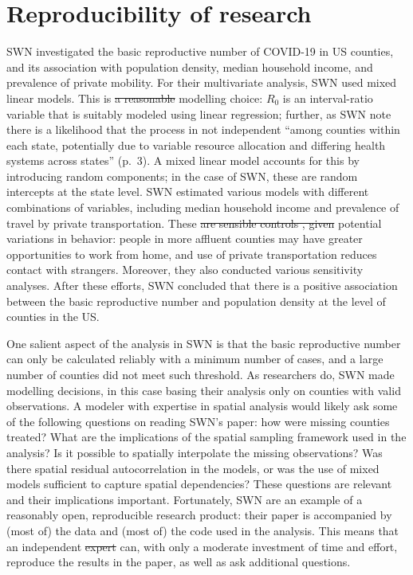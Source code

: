 \documentclass[]{elsarticle} %
\providecommand{\DIFaddtex}[1]{{\protect\color{blue}\uwave{#1}}} %
\providecommand{\DIFdeltex}[1]{{\protect\color{red}\sout{#1}}}                      %
\providecommand{\DIFaddbegin}{} %
\providecommand{\DIFaddend}{} %
\providecommand{\DIFdelbegin}{} %
\providecommand{\DIFdelend}{} %
\providecommand{\DIFadd}[1]{\texorpdfstring{\DIFaddtex{#1}}{#1}} %
\providecommand{\DIFdel}[1]{\texorpdfstring{\DIFdeltex{#1}}{}} %
\newcommand{\DIFscaledelfig}{0.5}
\newlength{\DIFdelgraphicswidth} %
\newlength{\DIFdelgraphicsheight} %
\newcommand{\DIFaddincludegraphics}[2][]{{\color{blue}\fbox{\DIFOincludegraphics[#1]{#2}}}} %
\newcommand{\DIFdelincludegraphics}[2][]{%
\sbox{\DIFdelgraphicsbox}{\DIFOincludegraphics[#1]{#2}}%
\settoboxwidth{\DIFdelgraphicswidth}{\DIFdelgraphicsbox} %
\settoboxtotalheight{\DIFdelgraphicsheight}{\DIFdelgraphicsbox} %
\scalebox{\DIFscaledelfig}{%
\parbox[b]{\DIFdelgraphicswidth}{\usebox{\DIFdelgraphicsbox}\\[-\baselineskip] \rule{\DIFdelgraphicswidth}{0em}}\llap{\resizebox{\DIFdelgraphicswidth}{\DIFdelgraphicsheight}{%
\setlength{\unitlength}{\DIFdelgraphicswidth}%
\begin{picture}(1,1)%
\thicklines\linethickness{2pt} %
{\color[rgb]{1,0,0}\put(0,0){\framebox(1,1){}}}%
{\color[rgb]{1,0,0}\put(0,0){\line( 1,1){1}}}%
{\color[rgb]{1,0,0}\put(0,1){\line(1,-1){1}}}%
\end{picture}%
}\hspace*{3pt}}} %
} %
\DeclareRobustCommand{\DIFaddbegin}{\DIFOaddbegin \let\includegraphics\DIFaddincludegraphics} %
\DeclareRobustCommand{\DIFaddend}{\DIFOaddend \let\includegraphics\DIFOincludegraphics} %
\DeclareRobustCommand{\DIFdelbegin}{\DIFOdelbegin \let\includegraphics\DIFdelincludegraphics} %
\DeclareRobustCommand{\DIFdelend}{\DIFOaddend \let\includegraphics\DIFOincludegraphics} %
\begin{document}
\hypertarget{reproducibility-of-research}{%
\section{Reproducibility of
research}\label{reproducibility-of-research}}

SWN investigated the basic reproductive number of COVID-19 in US
counties, and its association with population density, median household
income, and prevalence of private mobility. For their multivariate
analysis, SWN used mixed linear models. This is \DIFdelbegin \DIFdel{a reasonable }\DIFdelend \DIFaddbegin \DIFadd{an appropriate }\DIFaddend modelling
choice: \(R_0\) is an interval-ratio variable that is suitably modeled
using linear regression; further, as SWN note there is a likelihood that
the process in not independent ``among counties within each state,
potentially due to variable resource allocation and differing health
systems across states'' (p.~3). A mixed linear model accounts for this
by introducing random components; in the case of SWN, these are random
intercepts at the state level. SWN estimated various models with
different combinations of variables, including median household income
and prevalence of travel by private transportation. These \DIFdelbegin \DIFdel{are sensible
controls , given }\DIFdelend \DIFaddbegin \DIFadd{controls help
to account for }\DIFaddend potential variations in behavior: people in more affluent
counties may have greater opportunities to work from home, and use of
private transportation reduces contact with strangers. Moreover, they
also conducted various sensitivity analyses. After these efforts, SWN
concluded that there is a positive association between the basic
reproductive number and population density at the level of counties in
the US.

One salient aspect of the analysis in SWN is that the basic reproductive
number can only be calculated reliably with a minimum number of cases,
and a large number of counties did not meet such threshold. As
researchers do, SWN made modelling decisions, in this case basing their
analysis only on counties with valid observations. A modeler with
expertise in spatial analysis would likely ask some of the following
questions on reading SWN's paper: how were missing counties treated?
What are the implications of the spatial sampling framework used in the
analysis? Is it possible to spatially interpolate the missing
observations? Was there spatial residual autocorrelation in the models,
or was the use of mixed models sufficient to capture spatial
dependencies? These questions are relevant and their implications
important. Fortunately, SWN are an example of a reasonably open,
reproducible research product: their paper is accompanied by (most of)
the data and (most of) the code used in the analysis. This means that an
independent \DIFdelbegin \DIFdel{expert }\DIFdelend \DIFaddbegin \DIFadd{researcher }\DIFaddend can, with only a moderate investment of time and
effort, reproduce the results in the paper, as well as ask additional
questions.
\end{document}
